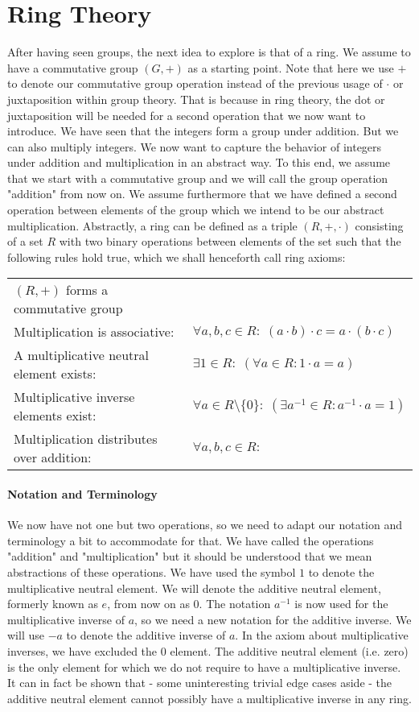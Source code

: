 \section{Ring Theory}
After having seen groups, the next idea to explore is that of a ring. We assume to have a commutative group $(G, +)$ as a starting point. Note that here we use $+$ to denote our commutative group operation instead of the previous usage of $\cdot$ or juxtaposition within group theory. That is because in ring theory, the dot or juxtaposition will be needed for a second operation that we now want to introduce. We have seen that the integers form a group under addition. But we can also multiply integers. We now want to capture the behavior of integers under addition and multiplication in an abstract way. To this end, we assume that we start with a commutative group and we will call the group operation "addition" from now on. We assume furthermore that we have defined a second operation between elements of the group which we intend to be our abstract multiplication. Abstractly, a ring can be defined as a triple $(R,+,\cdot)$ consisting of a set $R$ with two binary operations between elements of the set such that the following rules hold true, which we shall henceforth call ring axioms:

\medskip
\begin{tabular}{l l}
$(R,+)$ forms a commutative group \\	
Multiplication is associative: 
& $\forall a,b,c \in R: \;  (a \cdot b) \cdot c = a \cdot (b \cdot c)$   \\
A multiplicative neutral element exists: 
& $\exists 1 \in R: \; (\forall a \in R: 1 \cdot a = a)$ \\
Multiplicative inverse elements exist: 
& $\forall a \in R \setminus \{0\} : \; (\exists a^{-1} \in R: a^{-1} \cdot a = 1 )$ \\
Multiplication distributes over addition: 
& $\forall a,b,c \in R: \;$
\end{tabular}
\medskip

\paragraph{Notation and Terminology}
We now have not one but two operations, so we need to adapt our notation and terminology a bit to accommodate for that. We have called the operations "addition" and "multiplication" but it should be understood that we mean abstractions of these operations. We have used the symbol $1$ to denote the multiplicative neutral element. We will denote the additive neutral element, formerly known as $e$, from now on as $0$. The notation $a^{-1}$ is now used for the multiplicative inverse of $a$, so we need a new notation for the additive inverse. We will use $-a$ to denote the additive inverse of $a$. In the axiom about multiplicative inverses, we have excluded the $0$ element. The additive neutral element (i.e. zero) is the only element for which we do not require to have a multiplicative inverse. It can in fact be shown that - some uninteresting trivial edge cases aside - the additive neutral element cannot possibly have a multiplicative inverse in any ring.

